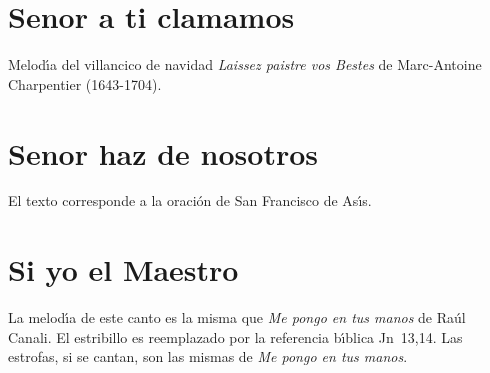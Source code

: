 \documentclass[landscape,12pt]{report}
\begin{document}
\section*{\small Senor a ti clamamos} \noindent\footnotesize Melod\'\i a del villancico de navidad \textit{Laissez paistre vos Bestes} de Marc-Antoine Charpentier (1643-1704).
\section*{\small Senor haz de nosotros} \noindent\footnotesize El texto corresponde a la oraci\'on de San Francisco de As\'\i s.  
\section*{\small Si yo el Maestro} La melod\'\i a de este canto es la misma que \textit{Me pongo en tus manos} de Ra\'ul Canali. El estribillo es reemplazado por la referencia b\'\i blica \mbox{Jn 13,14}. Las estrofas, si se cantan, son las mismas de \textit{Me pongo en tus manos}.
\end{document}

